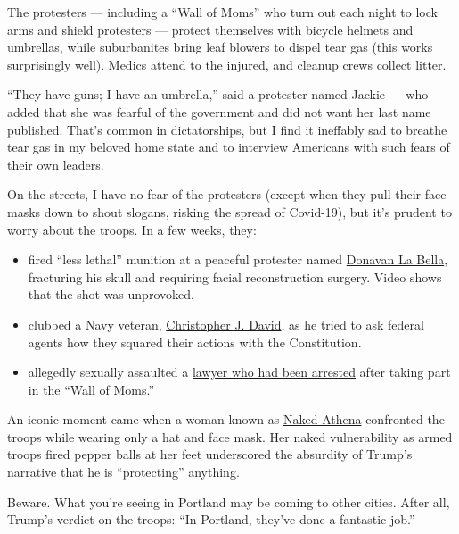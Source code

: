 The protesters --- including a ``Wall of Moms'' who turn out each night
to lock arms and shield protesters --- protect themselves with bicycle
helmets and umbrellas, while suburbanites bring leaf blowers to dispel
tear gas (this works surprisingly well). Medics attend to the injured,
and cleanup crews collect litter.

``They have guns; I have an umbrella,'' said a protester named Jackie
--- who added that she was fearful of the government and did not want
her last name published. That's common in dictatorships, but I find it
ineffably sad to breathe tear gas in my beloved home state and to
interview Americans with such fears of their own leaders.

On the streets, I have no fear of the protesters (except when they pull
their face masks down to shout slogans, risking the spread of Covid-19),
but it's prudent to worry about the troops. In a few weeks, they:

\begin{itemize}
\item
  fired ``less lethal'' munition at a peaceful protester named
  \href{https://www.oregonlive.com/portland/2020/07/donavan-la-bella-making-remarkable-recovery-from-head-injury-after-being-shot-by-feds-sister-says.html}{Donavan
  La Bella}, fracturing his skull and requiring facial reconstruction
  surgery. Video shows that the shot was unprovoked.
\item
  clubbed a Navy veteran,
  \href{https://www.nytimes3xbfgragh.onion/2020/07/20/us/portland-protests-navy-christopher-david.html}{Christopher
  J. David}, as he tried to ask federal agents how they squared their
  actions with the Constitution.
\item
  allegedly sexually assaulted a
  \href{https://heavy.com/news/2020/07/jennifer-kristiansen-portland-mom-arrested/?fbclid=IwAR2c1Q578gTltwDEb2Q_PoJzSQe8132kPnwpQzcrTBY9hO5jY_L5HQ6_TVk}{lawyer
  who had been arrested} after taking part in the ``Wall of Moms.''
\end{itemize}

An iconic moment came when a woman known as
\href{https://www.oregonlive.com/portland/2020/07/the-story-behind-the-surreal-photos-of-portland-protester-naked-athena.html}{Naked
Athena} confronted the troops while wearing only a hat and face mask.
Her naked vulnerability as armed troops fired pepper balls at her feet
underscored the absurdity of Trump's narrative that he is ``protecting''
anything.

Beware. What you're seeing in Portland may be coming to other cities.
After all, Trump's verdict on the troops: ``In Portland, they've done a
fantastic job.''

